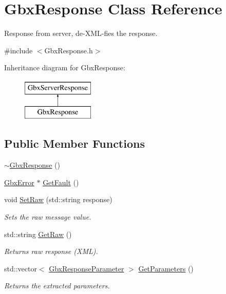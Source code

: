 \hypertarget{classGbxResponse}{\section{Gbx\-Response Class Reference}
\label{classGbxResponse}
}


Response from server, de-\/\-X\-M\-L-\/fies the response.  




{\ttfamily \#include $<$Gbx\-Response.\-h$>$}

Inheritance diagram for Gbx\-Response\-:\begin{figure}[H]
\begin{center}
\leavevmode
\includegraphics[height=2.000000cm]{classGbxResponse}
\end{center}
\end{figure}
\subsection*{Public Member Functions}
\begin{DoxyCompactItemize}
\item 
\hyperlink{classGbxResponse_a27e6c9c3452f2a0c90a33177af84236b}{$\sim$\-Gbx\-Response} ()
\item 
\hyperlink{structGbxError}{Gbx\-Error} $\ast$ \hyperlink{classGbxResponse_aaeb8f1ccd18ab88799d93ea78befc0df}{Get\-Fault} ()
\item 
void \hyperlink{classGbxResponse_aaf63a008c45be79f900e1131d0fb5565}{Set\-Raw} (std\-::string response)
\begin{DoxyCompactList}\small\item\em Sets the raw message value. \end{DoxyCompactList}\item 
std\-::string \hyperlink{classGbxServerResponse_aa449d9a63899e1d1205e6ab916798ba6}{Get\-Raw} ()
\begin{DoxyCompactList}\small\item\em Returns raw response (X\-M\-L). \end{DoxyCompactList}\item 
std\-::vector$<$ \hyperlink{classGbxResponseParameter}{Gbx\-Response\-Parameter} $>$ \hyperlink{classGbxServerResponse_a6d42bdaaeff3368e1fab2984940d2a2c}{Get\-Parameters} ()
\begin{DoxyCompactList}\small\item\em Returns the extracted parameters. \end{DoxyCompactList}\end{DoxyCompactItemize}
